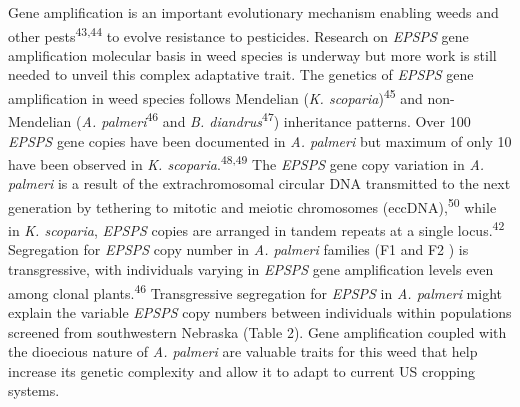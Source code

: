 \documentclass[
  12pt,
  a4paper]{article}
\begin{document}
Gene amplification is an important evolutionary mechanism enabling weeds
and other pests\textsuperscript{43,44} to evolve resistance to
pesticides. Research on \emph{EPSPS} gene amplification molecular basis
in weed species is underway but more work is still needed to unveil this
complex adaptative trait. The genetics of \emph{EPSPS} gene
amplification in weed species follows Mendelian (\emph{K.
scoparia})\textsuperscript{45} and non-Mendelian (\emph{A.
palmeri}\textsuperscript{46} and \emph{B. diandrus}\textsuperscript{47})
inheritance patterns. Over 100 \emph{EPSPS} gene copies have been
documented in \emph{A. palmeri} but maximum of only 10 have been
observed in \emph{K. scoparia}.\textsuperscript{48,49} The \emph{EPSPS}
gene copy variation in \emph{A. palmeri} is a result of the
extrachromosomal circular DNA transmitted to the next generation by
tethering to mitotic and meiotic chromosomes
(eccDNA),\textsuperscript{50} while in \emph{K. scoparia}, \emph{EPSPS}
copies are arranged in tandem repeats at a single
locus.\textsuperscript{42} Segregation for \emph{EPSPS} copy number in
\emph{A. palmeri} families (F\scriptsize 1 \normalsize and
F\scriptsize 2 \normalsize) is transgressive, with individuals varying
in \emph{EPSPS} gene amplification levels even among clonal
plants.\textsuperscript{46} Transgressive segregation for \emph{EPSPS}
in \emph{A. palmeri} might explain the variable \emph{EPSPS} copy
numbers between individuals within populations screened from
southwestern Nebraska (Table 2). Gene amplification coupled with the
dioecious nature of \emph{A. palmeri} are valuable traits for this weed
that help increase its genetic complexity and allow it to adapt to
current US cropping systems.
\end{document}

